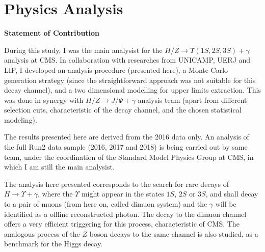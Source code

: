 \chapter{Physics Analysis}

\begin{tcolorbox}
    {\footnotesize 
    \textbf{Statement of Contribution}

    \vspace{1em}
    During this study, I was the main analysist for the $H/Z \rightarrow \Upsilon(1S, 2S, 3S) + \gamma$ analysis at CMS. In collaboration with researches from UNICAMP, UERJ and LIP, I developed an analysis procedure (presented here), a Monte-Carlo generation strategy (since the straightforward approach was not suitable for this decay channel), and a two dimensional modelling for upper limits extraction. This was done in synergy with $H/Z \rightarrow J/\Psi + \gamma$ analysis team (apart from different selection cuts, characteristic of the decay channel, and the chosen statistical modeling). 
    
    \vspace{1em}
    The results presented here are derived from the 2016 data only. An analysis of the full Run2 data sample (2016, 2017 and 2018) is being carried out by same team, under the coordination of the Standard Model Physics Group at CMS, in which I am still the main analysist.

    \vspace{1em}
    }
\end{tcolorbox}

The analysis here presented corresponds to the search for rare decays of $H \rightarrow \Upsilon + \gamma$, where the $\Upsilon$ might appear in the states $1S$, $2S$ or $3S$, and shall decay to a pair of muons (from here on, called dimuon system) and the $\gamma$ will be identified as a offline reconstructed photon. The decay to the dimuon channel offers a very efficient triggering for this process, characteristic of CMS. The analogous process of the $Z$ boson decays to the same channel is also studied, as a benchmark for the Higgs decay.

